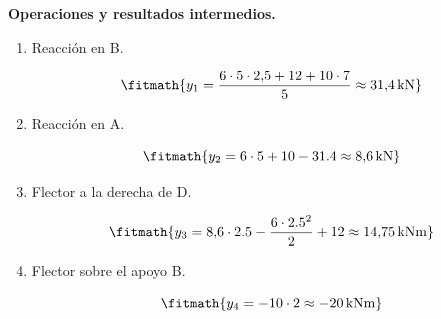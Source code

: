 \noindent\textbf{Operaciones y resultados intermedios.}

\begin{enumerate}

\item Reacción en B.

\[\fitmath{y_{1}=\frac{6\cdot 5\cdot 2{,}5+12+10\cdot 7}{5}\approx 31{,}4\,\mathrm{kN}}\]

\item Reacción en A.

\[\fitmath{y_{2}=6\cdot 5+10-31.4\approx 8{,}6\,\mathrm{kN}}\]

\item Flector a la derecha de D.

\[\fitmath{y_{3}=8{,}6\cdot 2.5-\frac{6\cdot {2.5}^{2}}{2}+12\approx 14{,}75\,\mathrm{kN m}}\]

\item Flector sobre el apoyo B.

\[\fitmath{y_{4}=-10\cdot 2\approx -20\,\mathrm{kN m}}\]

\end{enumerate}
